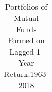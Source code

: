 \documentclass[a4paper]{article}
\begin{document}
\begin{table}[h!]
\begin{tabular}{c cc ccc cccccc}
        
        \toprule[1.5pt]
        \end{tabular}
        \caption{Portfolios of Mutual Funds Formed on Lagged 1-Year Return:1963-2018}
        \label{table:1}
        \end{table}
\end{document}
